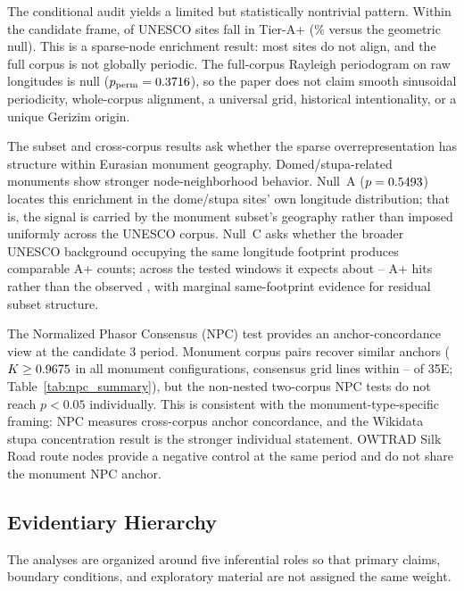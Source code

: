 The conditional audit yields a limited but statistically nontrivial
pattern. Within the candidate frame, \NclusterAp{} of
\NclusterTotal{} UNESCO sites fall in Tier-A+
(\clusterApRate\% versus the \NullRateAp{} geometric null). This is a
sparse-node enrichment result: most sites do not align, and the full
corpus is not globally periodic. The full-corpus Rayleigh periodogram
on raw longitudes is null ($p_\mathrm{perm} = 0.3716$), so
the paper does not claim smooth sinusoidal periodicity, whole-corpus
alignment, a universal grid, historical intentionality, or a unique
Gerizim origin.

The subset and cross-corpus results ask whether the sparse
overrepresentation has structure within Eurasian monument geography.
Domed/stupa-related monuments show stronger node-neighborhood
behavior. Null~A ($p = 0.5493$) locates this enrichment in
the dome/stupa sites' own longitude distribution; that is, the signal
is carried by the monument subset's geography rather than imposed
uniformly across the UNESCO corpus. Null~C asks whether the broader
UNESCO background occupying the same longitude footprint produces
comparable A+ counts; across the tested windows it expects about
\geoNullDomeRestrictedMeantwo{}--\geoNullDomeRestrictedMeanten{} A+
hits rather than the observed \NcircTierAp{}, with marginal
same-footprint evidence for residual subset structure.

The Normalized Phasor Consensus (NPC) test provides an
anchor-concordance view at the candidate 3\textdegree{} period.
Monument corpus pairs recover similar anchors ($K \geq 0.9675{}$
in all monument configurations, consensus grid lines within
\npcMonGridDeltaE\textdegree{}--\npcTwoGridDeltaE\textdegree{} of
35\textdegree{}E; Table~\ref{tab:npc_summary}), but the non-nested
two-corpus NPC tests do not reach $p<0.05$ individually. This is
consistent with the monument-type-specific framing: NPC measures
cross-corpus anchor concordance, and the Wikidata stupa
concentration result is the stronger individual statement. OWTRAD
Silk Road route nodes provide a negative control at the same period
and do not share the monument NPC anchor.

\subsection{Evidentiary Hierarchy}
\label{sec:evidentiary_hierarchy}

The analyses are organized around five inferential roles so that
primary claims, boundary conditions, and exploratory material are not
assigned the same weight.

